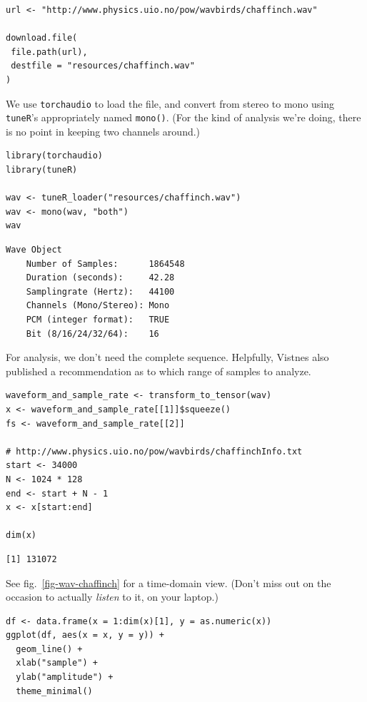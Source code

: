 \documentclass[
  letterpaper,
]{krantz}
\begin{document}
\begin{verbatim}
url <- "http://www.physics.uio.no/pow/wavbirds/chaffinch.wav"

download.file(
 file.path(url),
 destfile = "resources/chaffinch.wav"
)
\end{verbatim}

We use \texttt{torchaudio} to load the file, and convert from stereo to
mono using \texttt{tuneR}'s appropriately named \texttt{mono()}. (For
the kind of analysis we're doing, there is no point in keeping two
channels around.)

\begin{verbatim}
library(torchaudio)
library(tuneR)

wav <- tuneR_loader("resources/chaffinch.wav")
wav <- mono(wav, "both")
wav
\end{verbatim}

\begin{verbatim}
Wave Object
    Number of Samples:      1864548
    Duration (seconds):     42.28
    Samplingrate (Hertz):   44100
    Channels (Mono/Stereo): Mono
    PCM (integer format):   TRUE
    Bit (8/16/24/32/64):    16 
\end{verbatim}

For analysis, we don't need the complete sequence. Helpfully, Vistnes
also published a recommendation as to which range of samples to analyze.

\begin{verbatim}
waveform_and_sample_rate <- transform_to_tensor(wav)
x <- waveform_and_sample_rate[[1]]$squeeze()
fs <- waveform_and_sample_rate[[2]]

# http://www.physics.uio.no/pow/wavbirds/chaffinchInfo.txt
start <- 34000
N <- 1024 * 128
end <- start + N - 1
x <- x[start:end]

dim(x)
\end{verbatim}

\begin{verbatim}
[1] 131072
\end{verbatim}

See fig.~\ref{fig-wav-chaffinch} for a time-domain view. (Don't miss out
on the occasion to actually \emph{listen} to it, on your laptop.)

\begin{verbatim}
df <- data.frame(x = 1:dim(x)[1], y = as.numeric(x))
ggplot(df, aes(x = x, y = y)) +
  geom_line() +
  xlab("sample") +
  ylab("amplitude") +
  theme_minimal()
\end{verbatim}
\end{document}
